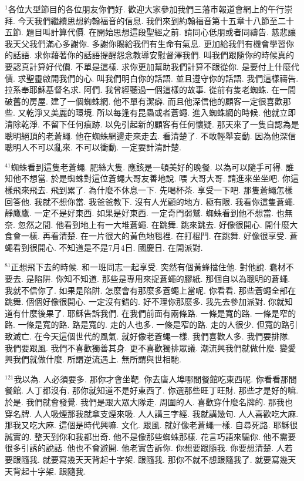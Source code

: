 \documentclass{book}
\begin{document}
$^{1}$各位大型節目的各位朋友你們好.
歡迎大家參加我們三藩市報道會網上的午行崇拜.
今天我們繼續思想約翰福音的信息.
我們來到約翰福音第十五章十八節至二十五節.
題目叫計算代價.
在開始思想這段聖經之前.
請同心低朋或者同禱告.
慈悲讓我天父我們滿心多謝你.
多謝你賜給我們有生命有氣息.
更加給我們有機會學習你的話語.
求你藉著你的話語提醒怨念教導安慰督澤我們.
叫我們跟隨你的時候真的要認真計算好代價.
不單是這樣.
求你更加幫助我們計算不跟從你.
是要付上什麼代價.
求聖靈啟開我們的心.
叫我們明白你的話語.
並且遵守你的話語.
我們這樣禱告.
拉系奉耶穌基督名求.
阿們.
我曾經聽過一個這樣的故事.
從前有隻老蜘蛛.
在一間破舊的房屋.
建了一個蜘蛛網.
他不單有潔癖.
而且他深信他的顧客一定很喜歡那些.
又乾淨又美麗的環境.
所以每逢有昆蟲或者蒼蠅.
進入蜘蛛網的時候.
他就立即清除乾淨.
不留下任何痕跡.
以免引起新的顧客有任何懷疑.
那天來了一隻自認為是聰明絕頂的老蒼蠅.
他在蜘蛛網邊走來走去.
看清楚了.
不敢輕舉妄動.
因為他深信聰明人不可以亂來.
不可以衝動.
一定要計清計楚.

$^{41}$蜘蛛看到這隻老蒼蠅.
肥絲大隻.
應該是一頓美好的晚餐.
以為可以隨手可得.
誰知他不想當.
於是蜘蛛對這位蒼蠅大哥友善地說.
喂 大哥大哥.
請進來坐坐吧.
你這樣飛來飛去.
飛到累了.
為什麼不休息一下.
先喝杯茶.
享受一下吧.
那隻蒼蠅怎樣回答他.
我就不想你當.
我爸爸教下.
沒有人光顧的地方.
極有限.
我看你這隻蒼蠅.
靜鷹鷹.
一定不是好東西.
如果是好東西.
一定奇門弱鷲.
蜘蛛看到他不想當.
也無奈.
忽然之間.
他看到地上有一大堆蒼蠅.
在跳舞.
跳來跳去.
好像很開心.
開什麼大食會一樣.
再看清楚.
在一片很大的黃色地毯裡.
在打棍鬥.
在跳舞.
好像很享受.
蒼蠅看到很開心.
不知道是不是7月4日.
國慶日.
在開派對.

$^{81}$正想飛下去的時候.
和一班同志一起享受.
突然有個黃蜂擋住他.
對他說.
蠢材不要去.
是陷阱.
你知不知道.
那些是專用來捉蒼蠅的膠紙.
那個自以為聰明的蒼蠅.
我就不信你了.
如果是陷阱.
怎麼會有那麼多蒼蠅上當呢.
你看看.
那些蒼蠅全部在跳舞.
個個好像很開心.
一定沒有錯的.
好不理你那麼多.
我先去參加派對.
你就知道有什麼後果了.
耶穌告訴我們.
在我們前面有兩條路.
一條是寬的路.
一條是窄的路.
一條是寬的路.
路是寬的.
走的人也多.
一條是窄的路.
走的人很少.
但寬的路引致滅亡.
在今天這個世代的風氣.
就好像老蒼蠅一樣.
我們喜歡人多.
我們要排隊.
我們要跟風.
我們不喜歡獨善其身.
更不喜歡獨排眾議.
潮流興我們就做什麼.
變愛興我們就做什麼.
所謂逆流遇上.
無所謂與世相馳.

$^{121}$我以為.
人必須要多.
那你才會坐靶.
你去唐人埠哪間餐館吃東西呢.
你看看那間餐館.
人丁都沒有.
那你就知道不是好東西了.
你選那些旺丁旺財.
那些才是好的嘛.
於是.
我們就會發覺.
我們是跟大眾大隊走.
周圍的人.
喜歡穿什麼名牌的.
那我也穿名牌.
人人吸煙那我就拿支煙來吸.
人人講三字經.
我就講幾句.
人人喜歡吃大麻.
那我又吃大麻.
這個是時代興嘛.
文化.
跟風.
就好像老蒼蠅一樣.
自尋死路.
耶穌很誠實的.
整天到你和我都出奇.
他不是像那些蜘蛛那樣.
花言巧語來騙你.
他不需要很多引誘的說話.
他也不會避開.
他老實告訴你.
你想要跟隨我.
你要想清楚.
人若要跟隨我.
就要寫幾天天背起十字架.
跟隨我.
那你不就不想跟隨我了.
就要寫幾天天背起十字架.
跟隨我.
\end{document}
